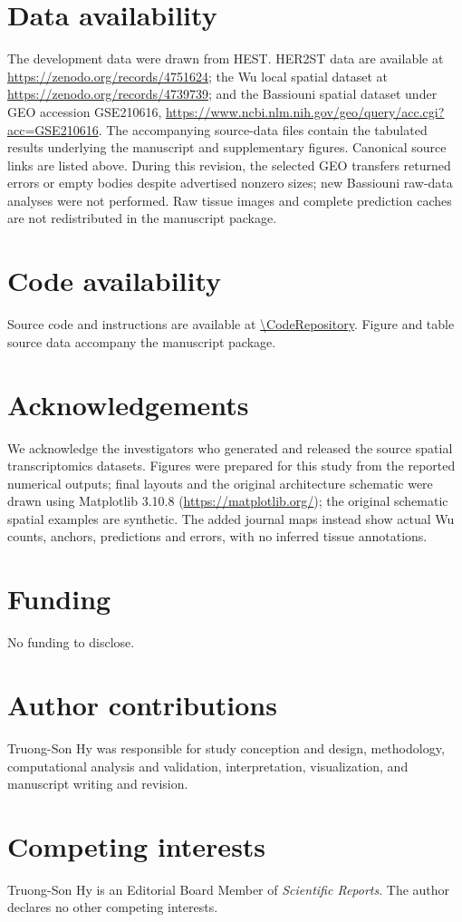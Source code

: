 \section{Data availability}
The development data were drawn from HEST\cite{jaume2024}. HER2ST data are available at \url{https://zenodo.org/records/4751624}; the Wu local spatial dataset at \url{https://zenodo.org/records/4739739}; and the Bassiouni spatial dataset under GEO accession GSE210616, \url{https://www.ncbi.nlm.nih.gov/geo/query/acc.cgi?acc=GSE210616}. The accompanying source-data files contain the tabulated results underlying the manuscript and supplementary figures. Canonical source links are listed above. During this revision, the selected GEO transfers returned errors or empty bodies despite advertised nonzero sizes; new Bassiouni raw-data analyses were not performed. Raw tissue images and complete prediction caches are not redistributed in the manuscript package. 

\section{Code availability}
Source code and instructions are available at \url{\CodeRepository}. Figure and table source data accompany the manuscript package.\par
\section{Acknowledgements}
We acknowledge the investigators who generated and released the source spatial transcriptomics datasets. Figures were prepared for this study from the reported numerical outputs; final layouts and the original architecture schematic were drawn using Matplotlib 3.10.8 (\url{https://matplotlib.org/}); the original schematic spatial examples are synthetic. The added journal maps instead show actual Wu counts, anchors, predictions and errors, with no inferred tissue annotations. 
\section{Funding}

No funding to disclose.

\section{Author contributions}

Truong-Son Hy was responsible for study conception and design, methodology, computational analysis and validation, interpretation, visualization, and manuscript writing and revision.

\section{Competing interests}

Truong-Son Hy is an Editorial Board Member of \textit{Scientific Reports}. The author declares no other competing interests.

\nolinenumbers



